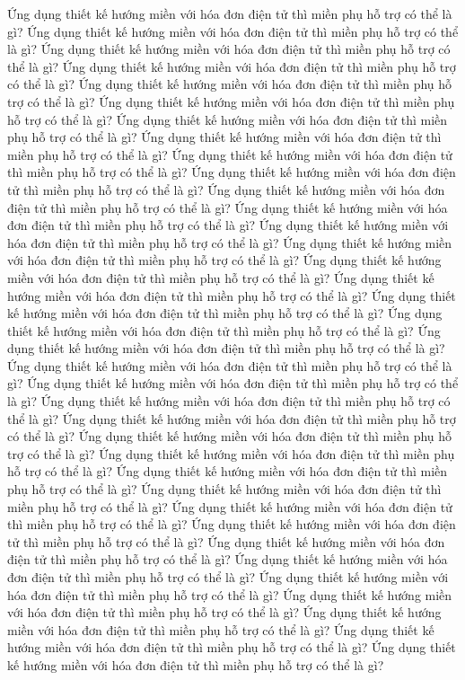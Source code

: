 Ứng dụng thiết kế hướng miền với hóa đơn điện tử thì miền phụ hỗ trợ có thể là gì?
Ứng dụng thiết kế hướng miền với hóa đơn điện tử thì miền phụ hỗ trợ có thể là gì?
Ứng dụng thiết kế hướng miền với hóa đơn điện tử thì miền phụ hỗ trợ có thể là gì?
Ứng dụng thiết kế hướng miền với hóa đơn điện tử thì miền phụ hỗ trợ có thể là gì?
Ứng dụng thiết kế hướng miền với hóa đơn điện tử thì miền phụ hỗ trợ có thể là gì?
Ứng dụng thiết kế hướng miền với hóa đơn điện tử thì miền phụ hỗ trợ có thể là gì?
Ứng dụng thiết kế hướng miền với hóa đơn điện tử thì miền phụ hỗ trợ có thể là gì?
Ứng dụng thiết kế hướng miền với hóa đơn điện tử thì miền phụ hỗ trợ có thể là gì?
Ứng dụng thiết kế hướng miền với hóa đơn điện tử thì miền phụ hỗ trợ có thể là gì?
Ứng dụng thiết kế hướng miền với hóa đơn điện tử thì miền phụ hỗ trợ có thể là gì?
Ứng dụng thiết kế hướng miền với hóa đơn điện tử thì miền phụ hỗ trợ có thể là gì?
Ứng dụng thiết kế hướng miền với hóa đơn điện tử thì miền phụ hỗ trợ có thể là gì?
Ứng dụng thiết kế hướng miền với hóa đơn điện tử thì miền phụ hỗ trợ có thể là gì?
Ứng dụng thiết kế hướng miền với hóa đơn điện tử thì miền phụ hỗ trợ có thể là gì?
Ứng dụng thiết kế hướng miền với hóa đơn điện tử thì miền phụ hỗ trợ có thể là gì?
Ứng dụng thiết kế hướng miền với hóa đơn điện tử thì miền phụ hỗ trợ có thể là gì?
Ứng dụng thiết kế hướng miền với hóa đơn điện tử thì miền phụ hỗ trợ có thể là gì?
Ứng dụng thiết kế hướng miền với hóa đơn điện tử thì miền phụ hỗ trợ có thể là gì?
Ứng dụng thiết kế hướng miền với hóa đơn điện tử thì miền phụ hỗ trợ có thể là gì?
Ứng dụng thiết kế hướng miền với hóa đơn điện tử thì miền phụ hỗ trợ có thể là gì?
Ứng dụng thiết kế hướng miền với hóa đơn điện tử thì miền phụ hỗ trợ có thể là gì?
Ứng dụng thiết kế hướng miền với hóa đơn điện tử thì miền phụ hỗ trợ có thể là gì?
Ứng dụng thiết kế hướng miền với hóa đơn điện tử thì miền phụ hỗ trợ có thể là gì?
Ứng dụng thiết kế hướng miền với hóa đơn điện tử thì miền phụ hỗ trợ có thể là gì?
Ứng dụng thiết kế hướng miền với hóa đơn điện tử thì miền phụ hỗ trợ có thể là gì?
Ứng dụng thiết kế hướng miền với hóa đơn điện tử thì miền phụ hỗ trợ có thể là gì?
Ứng dụng thiết kế hướng miền với hóa đơn điện tử thì miền phụ hỗ trợ có thể là gì?
Ứng dụng thiết kế hướng miền với hóa đơn điện tử thì miền phụ hỗ trợ có thể là gì?
Ứng dụng thiết kế hướng miền với hóa đơn điện tử thì miền phụ hỗ trợ có thể là gì?
Ứng dụng thiết kế hướng miền với hóa đơn điện tử thì miền phụ hỗ trợ có thể là gì?
Ứng dụng thiết kế hướng miền với hóa đơn điện tử thì miền phụ hỗ trợ có thể là gì?
Ứng dụng thiết kế hướng miền với hóa đơn điện tử thì miền phụ hỗ trợ có thể là gì?
Ứng dụng thiết kế hướng miền với hóa đơn điện tử thì miền phụ hỗ trợ có thể là gì?
Ứng dụng thiết kế hướng miền với hóa đơn điện tử thì miền phụ hỗ trợ có thể là gì?
Ứng dụng thiết kế hướng miền với hóa đơn điện tử thì miền phụ hỗ trợ có thể là gì?
Ứng dụng thiết kế hướng miền với hóa đơn điện tử thì miền phụ hỗ trợ có thể là gì?